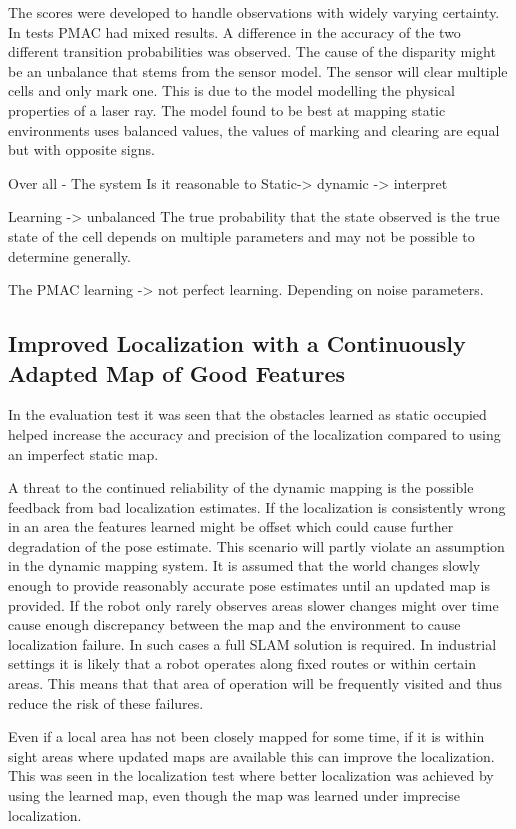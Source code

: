 The scores were developed to handle observations with widely varying certainty. 
In tests PMAC had mixed results. 
A difference in the accuracy of the two different transition probabilities was observed. 
The cause of the disparity might be an unbalance that stems from the sensor model. 
The sensor will clear multiple cells and only mark one. 
This is due to the model modelling the physical properties of a laser ray. 
The model found to be best at mapping static environments uses balanced values, the values of marking and clearing are equal but with opposite signs. 

Over all - The system
Is it reasonable to Static-> dynamic -> interpret

Learning -> unbalanced
The true probability that the state observed is the true state of the cell depends on multiple parameters and may not be possible to determine generally. 


The PMAC learning -> not perfect learning. Depending on noise parameters. 

\subsection{Improved Localization with a Continuously Adapted Map of Good Features}

In the evaluation test it was seen that the obstacles learned as static occupied helped increase the accuracy and precision of the localization compared to using an imperfect static map. 

A threat to the continued reliability of the dynamic mapping is the possible feedback from bad localization estimates. 
If the localization is consistently wrong in an area the features learned might be offset which could cause further degradation of the pose estimate.
This scenario will partly violate an assumption in the dynamic mapping system. 
It is assumed that the world changes slowly enough to provide reasonably accurate pose estimates until an updated map is provided. 
If the robot only rarely observes areas slower changes might over time cause enough discrepancy between the map and the environment to cause localization failure.
In such cases a full SLAM solution is required.
In industrial settings it is likely that a robot operates along fixed routes or within certain areas. This means that that area of operation will be frequently visited and thus reduce the risk of these failures.

Even if a local area has not been closely mapped for some time, if it is within sight areas where updated maps are available this can improve the localization. 
This was seen in the localization test where better localization was achieved by using the learned map, even though the map was learned under imprecise localization.
